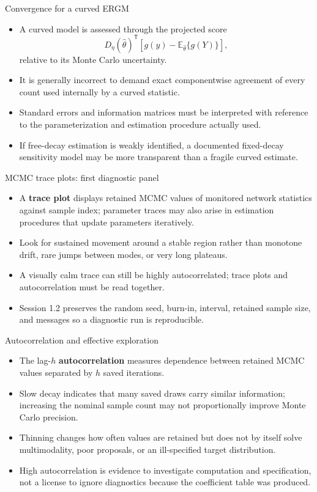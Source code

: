 \documentclass[aspectratio=169,11pt]{beamer}
\newcommand{\E}{\mathbb{E}}
\newcommand{\term}[1]{\textbf{\color{nupurple}#1}}
\begin{document}
\begin{frame}{Convergence for a curved ERGM}
\begin{itemize}
\item A curved model is assessed through the projected score
\[
D_{\eta}(\hat\theta)^{\mathsf T}\left[g(y)-\E_{\hat\theta}\{g(Y)\}\right],
\]
relative to its Monte Carlo uncertainty.
\item It is generally incorrect to demand exact componentwise agreement of every count used internally by a curved statistic.
\item Standard errors and information matrices must be interpreted with reference to the parameterization and estimation procedure actually used.
\item If free-decay estimation is weakly identified, a documented fixed-decay sensitivity model may be more transparent than a fragile curved estimate.
\end{itemize}
\end{frame}

\begin{frame}{MCMC trace plots: first diagnostic panel}
\begin{itemize}
\item A \term{trace plot} displays retained MCMC values of monitored network statistics against sample index; parameter traces may also arise in estimation procedures that update parameters iteratively.
\item Look for sustained movement around a stable region rather than monotone drift, rare jumps between modes, or very long plateaus.
\item A visually calm trace can still be highly autocorrelated; trace plots and autocorrelation must be read together.
\item Session 1.2 preserves the random seed, burn-in, interval, retained sample size, and messages so a diagnostic run is reproducible.
\end{itemize}
\end{frame}

\begin{frame}{Autocorrelation and effective exploration}
\begin{itemize}
\item The lag-$h$ \term{autocorrelation} measures dependence between retained MCMC values separated by $h$ saved iterations.
\item Slow decay indicates that many saved draws carry similar information; increasing the nominal sample count may not proportionally improve Monte Carlo precision.
\item Thinning changes how often values are retained but does not by itself solve multimodality, poor proposals, or an ill-specified target distribution.
\item High autocorrelation is evidence to investigate computation and specification, not a license to ignore diagnostics because the coefficient table was produced.
\end{itemize}
\end{frame}
\end{document}
